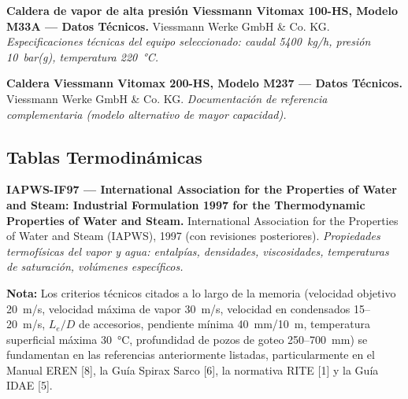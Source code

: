 \begin{enumerate}[label={[\arabic*]}, leftmargin=2em, resume]
	\item \textbf{Caldera de vapor de alta presión Viessmann Vitomax 100-HS, Modelo M33A --- Datos Técnicos.}
	      Viessmann Werke GmbH \& Co. KG.
	      \textit{Especificaciones técnicas del equipo seleccionado: caudal 5400~kg/h, presión 10~bar(g), temperatura 220~°C.}

	\item \textbf{Caldera Viessmann Vitomax 200-HS, Modelo M237 --- Datos Técnicos.}
	      Viessmann Werke GmbH \& Co. KG.
	      \textit{Documentación de referencia complementaria (modelo alternativo de mayor capacidad).}
\end{enumerate}

\subsection*{Tablas Termodinámicas}

\begin{enumerate}[label={[\arabic*]}, leftmargin=2em, resume]
	\item \textbf{IAPWS-IF97 --- International Association for the Properties of Water and Steam: Industrial Formulation 1997 for the Thermodynamic Properties of Water and Steam.}
	      International Association for the Properties of Water and Steam (IAPWS), 1997 (con revisiones posteriores).
	      \textit{Propiedades termofísicas del vapor y agua: entalpías, densidades, viscosidades, temperaturas de saturación, volúmenes específicos.}
\end{enumerate}

\vspace{0.5cm}
\noindent\textbf{Nota:} Los criterios técnicos citados a lo largo de la memoria (velocidad objetivo 20~m/s, velocidad máxima de vapor 30~m/s, velocidad en condensados 15--20~m/s, $L_e/D$ de accesorios, pendiente mínima 40~mm/10~m, temperatura superficial máxima 30~°C, profundidad de pozos de goteo 250--700~mm) se fundamentan en las referencias anteriormente listadas, particularmente en el Manual EREN [8], la Guía Spirax Sarco [6], la normativa RITE [1] y la Guía IDAE [5].


